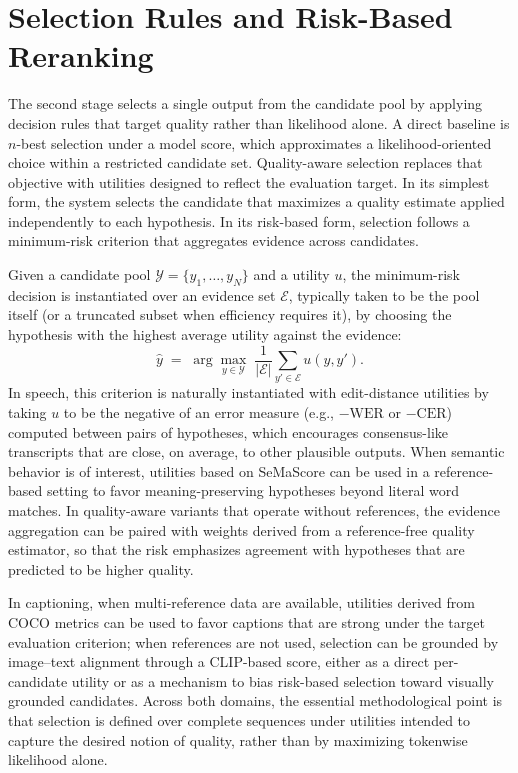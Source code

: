 \section{Selection Rules and Risk-Based Reranking}

The second stage selects a single output from the candidate pool by applying decision rules that target quality rather than likelihood alone. A direct baseline is \(n\)-best selection under a model score, which approximates a likelihood-oriented choice within a restricted candidate set. Quality-aware selection replaces that objective with utilities designed to reflect the evaluation target. In its simplest form, the system selects the candidate that maximizes a quality estimate applied independently to each hypothesis. In its risk-based form, selection follows a minimum-risk criterion that aggregates evidence across candidates.

Given a candidate pool \(\mathcal{Y}=\{y_1,\dots,y_N\}\) and a utility \(u\), the minimum-risk decision is instantiated over an evidence set \(\mathcal{E}\), typically taken to be the pool itself (or a truncated subset when efficiency requires it), by choosing the hypothesis with the highest average utility against the evidence:
\[
\hat{y} \;=\; \arg\max_{y\in \mathcal{Y}}\; \frac{1}{|\mathcal{E}|}\sum_{y'\in\mathcal{E}} u(y,y').
\]
In speech, this criterion is naturally instantiated with edit-distance utilities by taking \(u\) to be the negative of an error measure (e.g., \(-\mathrm{WER}\) or \(-\mathrm{CER}\)) computed between pairs of hypotheses, which encourages consensus-like transcripts that are close, on average, to other plausible outputs. When semantic behavior is of interest, utilities based on SeMaScore can be used in a reference-based setting to favor meaning-preserving hypotheses beyond literal word matches. In quality-aware variants that operate without references, the evidence aggregation can be paired with weights derived from a reference-free quality estimator, so that the risk emphasizes agreement with hypotheses that are predicted to be higher quality.

In captioning, when multi-reference data are available, utilities derived from COCO metrics can be used to favor captions that are strong under the target evaluation criterion; when references are not used, selection can be grounded by image--text alignment through a CLIP-based score, either as a direct per-candidate utility or as a mechanism to bias risk-based selection toward visually grounded candidates. Across both domains, the essential methodological point is that selection is defined over complete sequences under utilities intended to capture the desired notion of quality, rather than by maximizing tokenwise likelihood alone.

